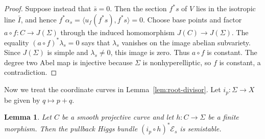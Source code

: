 \documentclass[oneside,11pt]{amsart}
\newtheorem{lem}[thm]{Lemma}
\theoremstyle{definition}
\theoremstyle{remark}
\numberwithin{thm}{section}
\numberwithin{equation}{section}
\begin{document}
\begin{proof}
Suppose instead that $\bar s=0$.  Then the section $f^*s$ of $V$ lies in the isotropic line $\bar I$, and hence $f^*\alpha_s=\langle u_f(f^*s),f^*s\rangle=0$. Choose base points and factor $a\circ f:C\to J(\Sigma)$ through the induced
homomorphism $J(C)\longrightarrow J(\Sigma)$. The equality $(a\circ f)^*\lambda_s=0$ says that $\lambda_s$ vanishes on
the image abelian subvariety.  Since $J(\Sigma)$ is simple and
$\lambda_s\neq0$, this image is zero.  Thus $a\circ f$ is constant.  The degree two Abel map is injective because $\Sigma$ is nonhyperelliptic, so $f$ is constant, a contradiction.
\end{proof}

Now we treat the coordinate curves in Lemma~\ref{lem:root-divisor}.  Let $i_p:\Sigma\to X$ be given by $q\mapsto p+q$.

\begin{lem}\label{lem:coordinate}
Let $C$ be a smooth projective curve and let $h:C\to\Sigma$ be a
finite morphism.  Then the pullback Higgs bundle $(i_p\circ h)^*\mathcal{E}_s$ is semistable.
\end{lem}
\end{document}
